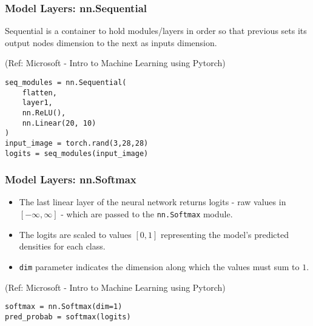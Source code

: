 \begin{frame}[fragile] \frametitle{Model Layers: nn.Sequential}

Sequential is a container to hold modules/layers in order so that previous sets its output nodes dimension to the next as inputs dimension.

\tiny{(Ref: Microsoft - Intro to Machine Learning using Pytorch)}

\begin{lstlisting}
seq_modules = nn.Sequential(
    flatten,
    layer1,
    nn.ReLU(),
    nn.Linear(20, 10)
)
input_image = torch.rand(3,28,28)
logits = seq_modules(input_image)

\end{lstlisting}

\end{frame}
\begin{frame}[fragile] \frametitle{Model Layers: nn.Softmax}

\begin{itemize}
\item The last linear layer of the neural network returns logits - raw values in $[-\infty, \infty]$ - which are passed to the \lstinline|nn.Softmax| module. 
\item The logits are scaled to values $[0, 1]$ representing the model's predicted densities for each class. 
\item \lstinline|dim| parameter indicates the dimension along which the values must sum to $1$.
\end{itemize}

\tiny{(Ref: Microsoft - Intro to Machine Learning using Pytorch)}

\begin{lstlisting}
softmax = nn.Softmax(dim=1)
pred_probab = softmax(logits)
\end{lstlisting}

\end{frame}

